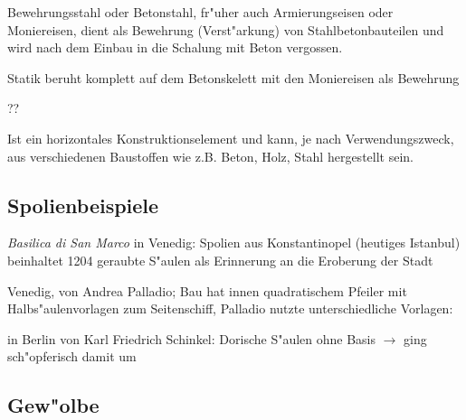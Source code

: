 \documentclass[emulatestandardclasses]{scrartcl}
\begin{document}
\begin{description}[leftmargin=!,labelwidth=\widthof{\bfseries Stahlbetonskelettbau}]
  \item[Amierung] Bewehrungsstahl oder Betonstahl, fr"uher auch Armierungseisen oder Moniereisen, dient als Bewehrung (Verst"arkung) von Stahlbetonbauteilen und wird nach dem Einbau in die Schalung mit Beton vergossen.
  \item[Stahlbetonskelettbau] Statik beruht komplett auf dem Betonskelett mit den Moniereisen als Bewehrung
  \item[Schalung (Beton)] ??
  \item[Binder] Ist ein horizontales Konstruktionselement und kann, je nach Verwendungszweck, aus verschiedenen Baustoffen wie z.B. Beton, Holz, Stahl hergestellt sein.
\end{description}

\subsection{Spolienbeispiele}

\begin{description}[leftmargin=!,labelwidth=\widthof{\bfseries San Giorgio Maggiorei}]
  \item[Markusdom] \emph{Basilica di San Marco} in Venedig: Spolien aus Konstantinopel (heutiges Istanbul) beinhaltet 1204 geraubte S"aulen als Erinnerung an die Eroberung der Stadt
  \item[San Giorgio Maggiore] Venedig, von Andrea Palladio; Bau hat innen quadratischem Pfeiler mit Halbs"aulenvorlagen zum Seitenschiff, Palladio nutzte unterschiedliche Vorlagen:
  \item[Neue Wache] in Berlin von Karl Friedrich Schinkel: Dorische S"aulen ohne Basis $\rightarrow$ ging sch"opferisch damit um
\end{description}


\subsection{Gew"olbe}
\end{document}
